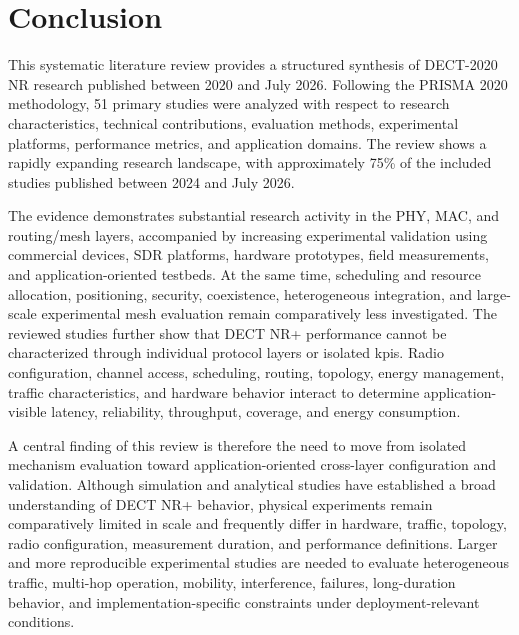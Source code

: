 \section{Conclusion}
\label{sec:conclusion}

This systematic literature review provides a structured synthesis of DECT-2020 NR research published between 2020 and July 2026. Following the PRISMA 2020 methodology, 51 primary studies were analyzed with respect to research characteristics, technical contributions, evaluation methods, experimental platforms, performance metrics, and application domains. The review shows a rapidly expanding research landscape, with approximately 75\% of the included studies published between 2024 and July 2026.

The evidence demonstrates substantial research activity in the PHY, MAC, and routing/mesh layers, accompanied by increasing experimental validation using commercial devices, SDR platforms, hardware prototypes, field measurements, and application-oriented testbeds. At the same time, scheduling and resource allocation, positioning, security, coexistence, heterogeneous integration, and large-scale experimental mesh evaluation remain comparatively less investigated. The reviewed studies further show that DECT NR+ performance cannot be characterized through individual protocol layers or isolated \glspl{kpi}. Radio configuration, channel access, scheduling, routing, topology, energy management, traffic characteristics, and hardware behavior interact to determine application-visible latency, reliability, throughput, coverage, and energy consumption.

A central finding of this review is therefore the need to move from isolated mechanism evaluation toward application-oriented cross-layer configuration and validation. Although simulation and analytical studies have established a broad understanding of DECT NR+ behavior, physical experiments remain comparatively limited in scale and frequently differ in hardware, traffic, topology, radio configuration, measurement duration, and performance definitions. Larger and more reproducible experimental studies are needed to evaluate heterogeneous traffic, multi-hop operation, mobility, interference, failures, long-duration behavior, and implementation-specific constraints under deployment-relevant conditions.

